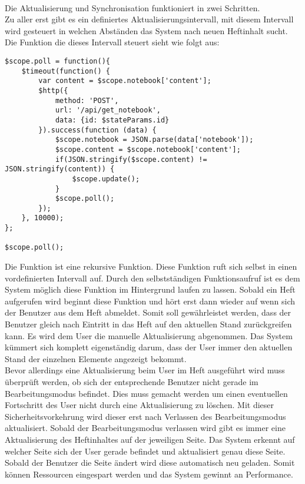 \\
Die Aktualisierung und Synchronisation funktioniert in zwei Schritten.\\
Zu aller erst gibt es ein definiertes Aktualisierungsintervall, mit diesem Intervall wird gesteuert in welchen Abständen das System nach neuen Heftinhalt sucht. Die Funktion die dieses Intervall steuert sieht wie folgt aus:
\begin{lstlisting}[caption={Aktualisierung - PWS}]
$scope.poll = function(){
    $timeout(function() {
        var content = $scope.notebook['content'];
        $http({
            method: 'POST',
            url: '/api/get_notebook',
            data: {id: $stateParams.id}
        }).success(function (data) {
            $scope.notebook = JSON.parse(data['notebook']);
            $scope.content = $scope.notebook['content'];
            if(JSON.stringify($scope.content) != JSON.stringify(content)) {
                $scope.update();
            }
            $scope.poll();
        });
    }, 10000);
};

$scope.poll();
\end{lstlisting}
Die Funktion ist eine rekursive Funktion. Diese Funktion ruft sich selbst in einen vordefinierten Intervall auf. Durch den selbstständigen Funktionsaufruf ist es dem System möglich diese Funktion im Hintergrund laufen zu lassen. Sobald ein Heft aufgerufen wird beginnt diese Funktion und hört erst dann wieder auf wenn sich der Benutzer aus dem Heft abmeldet. Somit soll gewährleistet werden, dass der Benutzer gleich nach Eintritt in das Heft auf den aktuellen Stand zurückgreifen kann. Es wird dem User die manuelle Aktualisierung abgenommen. Das System kümmert sich komplett eigenständig darum, dass der User immer den aktuellen Stand der einzelnen Elemente angezeigt bekommt. \\
Bevor allerdings eine Aktualisierung beim User im Heft ausgeführt wird muss überprüft werden, ob sich der entsprechende Benutzer nicht gerade im Bearbeitungsmodus befindet. Dies muss gemacht werden um einen eventuellen Fortschritt des User nicht durch eine Aktualisierung zu löschen. Mit dieser Sicherheitsvorkehrung wird dieser erst nach Verlassen des Bearbeitungsmodus aktualisiert. Sobald der Bearbeitungsmodus verlassen wird gibt es immer eine Aktualisierung des Heftinhaltes auf der jeweiligen Seite. Das System erkennt auf welcher Seite sich der User gerade befindet und aktualisiert genau diese Seite. Sobald der Benutzer die Seite ändert wird diese automatisch neu geladen. Somit können Ressourcen eingespart werden und das System gewinnt an Performance.\\

